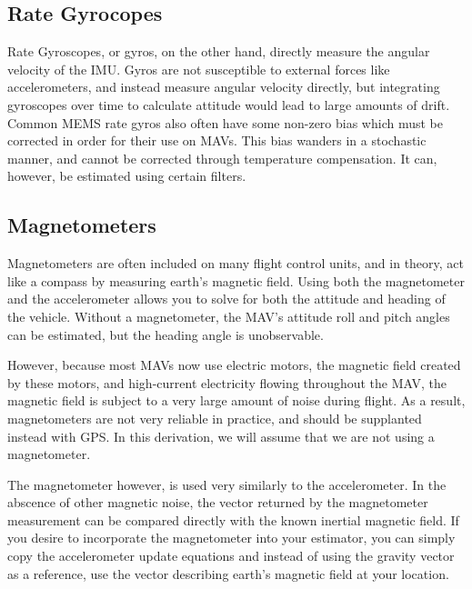 \documentclass[paper=a4, fontsize=11pt]{scrartcl} %
\numberwithin{equation}{section} %
\numberwithin{figure}{section} %
\numberwithin{table}{section} %
\begin{document}
\subsection{Rate Gyrocopes}

Rate Gyroscopes, or gyros, on the other hand, directly measure the angular velocity of the IMU.  Gyros are not susceptible to external forces like accelerometers, and instead measure angular velocity directly, but integrating gyroscopes over time to calculate attitude would lead to large amounts of drift.  Common MEMS rate gyros also often have some non-zero bias which must be corrected in order for their use on MAVs. This bias wanders in a stochastic manner, and cannot be corrected through temperature compensation.  It can, however, be estimated using certain filters.

\subsection{Magnetometers}

Magnetometers are often included on many flight control units, and in theory, act like a compass by measuring earth's magnetic field.  Using both the magnetometer and the accelerometer allows you to solve for both the attitude and heading of the vehicle.  Without a magnetometer, the MAV's attitude roll and pitch angles can be estimated, but the heading angle is unobservable.

However, because most MAVs now use electric motors, the magnetic field created by these motors, and high-current electricity flowing throughout the MAV, the magnetic field is subject to a very large amount of noise during flight.  As a result, magnetometers are not very reliable in practice, and should be supplanted instead with GPS.  In this derivation, we will assume that we are not using a magnetometer.

The magnetometer however, is used very similarly to the accelerometer. In the abscence of other magnetic noise, the vector returned by the magnetometer measurement can be compared directly with the known inertial magnetic field.  If you desire to incorporate the magnetometer into your estimator, you can simply copy the accelerometer update equations and instead of using the gravity vector as a reference, use the vector describing earth's magnetic field at your location.
\end{document}
